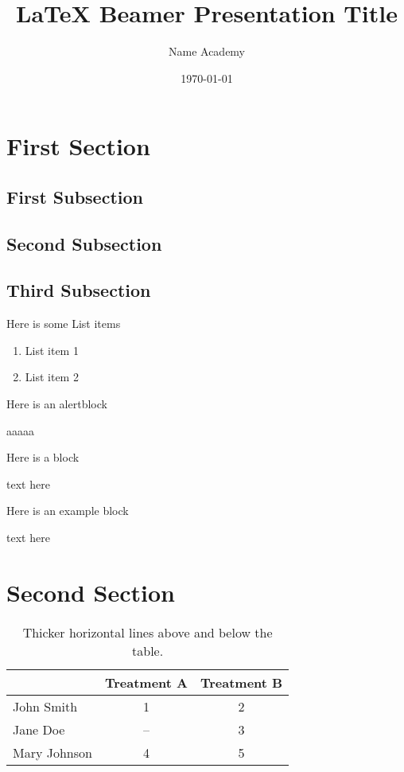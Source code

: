 \documentclass[xcolor=dvipsnames]{beamer}
\title[LaTeX Beamer Presentation Title]{ LaTeX Beamer Presentation Title}
\date{\today}
\author[Sofyane ]{Name Academy}
\institute[Templates LaTeX Beamer]{ \LaTeX }
\begin{document}
\begin{frame}
  \titlepage
\end{frame}
\begin{frame}
\tableofcontents
\end{frame}
\section{First Section}
\subsection{First Subsection}
\subsection{Second Subsection}
\subsection{Third Subsection}
\begin{frame}
 Here is some List items
 \begin{enumerate}
 \item List item 1
 \item List item 2
 \end{enumerate}
 Here is an alertblock
 \begin{alertblock}
 aaaaa
 \end{alertblock}
 Here is a block
 \begin{block}
 text here
 \end{block}
 Here is an example block
 \begin{exampleblock}
 text here
 \end{exampleblock}
\end{frame}
\section{Second Section}
\begin{frame}
\begin{table}[ht]
\centering
\caption{Thicker horizontal lines above and below the table.}
\begin{tabular}[t]{lcc}
\toprule
&Treatment A&Treatment B\\
\midrule
John Smith&1&2\\
Jane Doe&--&3\\
Mary Johnson&4&5\\
\bottomrule
\end{tabular}
\end{table}
\end{frame}
\end{document}
